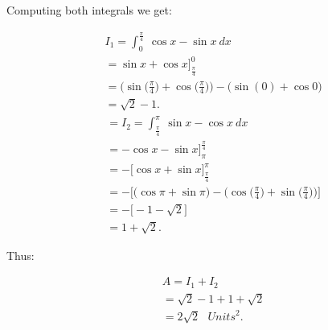 \documentclass{report}
\begin{document}
    \bigbreak \noindent 
    \begin{minipage}[t]{0.47\textwidth}
        Computing both integrals we get:
    \end{minipage}
    \begin{minipage}[t]{0.47\textwidth}
    
    \begin{align*}
        &I_{1} = \int_{0}^{\frac{\pi}{4}}\ \cos{x}-\sin{x}\ dx \\
        &=\sin{x} + \cos{x}\bigg]^{0}_{\frac{\pi}{4}} \\
        &= \bigg(\sin{\bigg(\frac{\pi}{4}\bigg)+\cos{\bigg(\frac{\pi}{4}\bigg)}}\bigg) - \bigg(\sin{(0)+\cos{0}}\bigg)\\
        &= \sqrt{2} - 1
    .\end{align*}
    \begin{align*}
        &=I_{2} = \int_{\frac{\pi}{4}}^{\pi}\ \sin{x}-\cos{x}\ dx \\
        &= -\cos{x}-\sin{x}\bigg]^{\frac{\pi}{4}}_{\pi} \\
        &= - \bigg[\cos{x}+\sin{x}\bigg]^{\pi}_{\frac{\pi}{4}} \\
        &= - \bigg[\bigg(\cos{\pi}+\sin{\pi}\bigg) - \bigg(\cos{\bigg(\frac{\pi}{4}\bigg)+\sin{\bigg(\frac{\pi}{4}\bigg)}}\bigg)\bigg] \\
        &= - \bigg[-1 - \sqrt{2}\bigg] \\
        &= 1 + \sqrt{2}
    .\end{align*}
    \end{minipage}
    \bigbreak \noindent 
    \begin{minipage}[t]{0.47\textwidth}
        Thus:
    \end{minipage}
    \begin{minipage}[t]{0.22\textwidth}
        \begin{align*}
        &A = I_{1} + I_{2} \\
        &= \sqrt{2} - 1 + 1 + \sqrt{2} \\
        & = 2\sqrt{2}\ \ \ Units^{2}
    .\end{align*}
    \end{minipage}

    \pagebreak 
\end{document}
